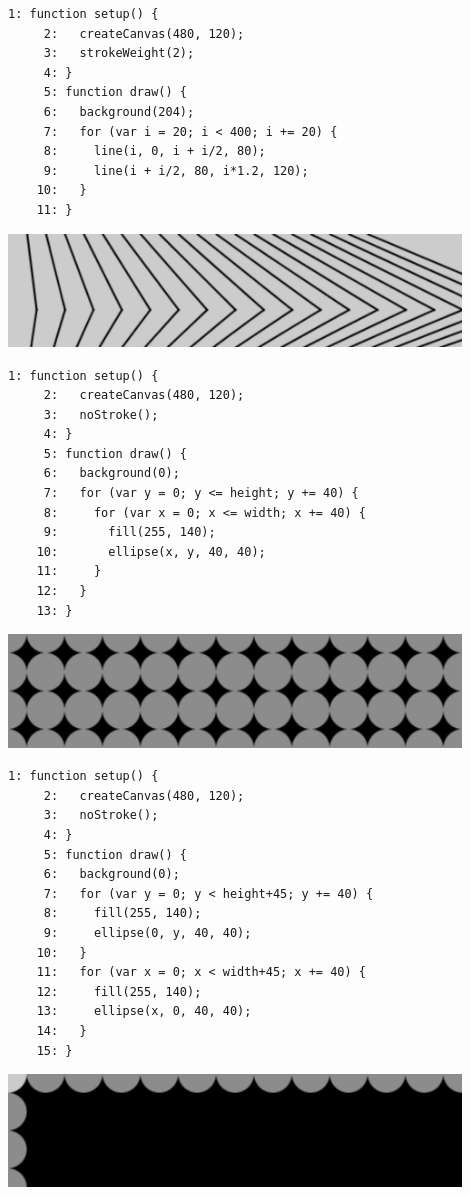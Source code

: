 \documentclass[a4j]{ltjsarticle}
\begin{document}
\begin{lstlisting}[caption=Ex\_04\_09.js]
     1: function setup() {
     2:   createCanvas(480, 120);
     3:   strokeWeight(2);
     4: }
     5: function draw() {
     6:   background(204);  
     7:   for (var i = 20; i < 400; i += 20) {
     8:     line(i, 0, i + i/2, 80);
     9:     line(i + i/2, 80, i*1.2, 120);
    10:   }
    11: }
\end{lstlisting}
\includegraphics[height=3cm]{image/Ex_04_09.pdf}
\begin{lstlisting}[caption=Ex\_04\_10.js]
     1: function setup() {
     2:   createCanvas(480, 120);
     3:   noStroke();
     4: }
     5: function draw() {
     6:   background(0);
     7:   for (var y = 0; y <= height; y += 40) {
     8:     for (var x = 0; x <= width; x += 40) {
     9:       fill(255, 140);
    10:       ellipse(x, y, 40, 40);
    11:     }
    12:   }
    13: }
\end{lstlisting}
\includegraphics[height=3cm]{image/Ex_04_10.pdf}
\begin{lstlisting}[caption=Ex\_04\_11.js]
     1: function setup() {
     2:   createCanvas(480, 120);
     3:   noStroke();
     4: }
     5: function draw() {
     6:   background(0);
     7:   for (var y = 0; y < height+45; y += 40) {
     8:     fill(255, 140);
     9:     ellipse(0, y, 40, 40);
    10:   }
    11:   for (var x = 0; x < width+45; x += 40) {
    12:     fill(255, 140);
    13:     ellipse(x, 0, 40, 40);
    14:   }
    15: }
\end{lstlisting}
\includegraphics[height=3cm]{image/Ex_04_11.pdf}
\end{document}
